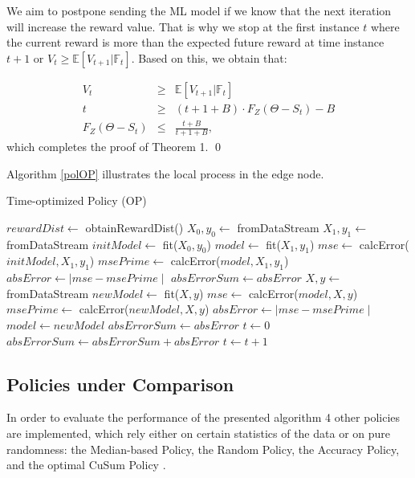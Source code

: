 \documentclass{mpaper}
\begin{document}
We aim to postpone sending the ML model if we know that the next iteration will increase the reward value. That is why we stop at the first instance $t$ where the current reward is more than the expected future reward at time instance $t+1$ or $V_{t} \geq \mathbb{E}[V_{t+1}|\mathbb{F}_{t}]$. Based on this, we obtain that:

\begin{eqnarray}
    V_t & \geq  & \mathbb{E}[V_{t+1}|\mathbb{F}_t] \\
    t & \geq  & (t+1+B)\cdot F_{Z}(\Theta - S_t) - B\\
    F_{Z}(\Theta - S_t) &\leq & \frac{t+B}{t+1+B},
\end{eqnarray}
which completes the proof of Theorem 1. 
\qed

Algorithm \ref{polOP} illustrates the local process in the edge node. 

\begin{algorithm}
\caption{Time-optimized Policy (OP)}\label{polOP}
\begin{algorithmic}
\State $rewardDist \gets$ obtainRewardDist() 
\State $X_0, y_0\gets$ fromDataStream
\State $X_1, y_1 \gets$ fromDataStream
\State $initModel \gets$ fit($X_0, y_0$)
\State $model \gets$ fit($X_1, y_1$)
\State $mse \gets$ calcError($initModel,X_1,y_1$)
\State $msePrime \gets$ calcError($model,X_1,y_1$)
\State $absError \gets \mid mse - msePrime \mid$
\State $absErrorSum \gets absError$
    \State $X, y \gets$ fromDataStream
    \State $newModel \gets$ fit($X,y$)
    \State $mse \gets$ calcError($model,X,y$)
    \State $msePrime \gets$ calcError($newModel,X,y$)
    \State $absError \gets \mid mse - msePrime \mid$
        \State $model \gets newModel$ 
        \State $absErrorSum \gets absError$
        \State $t \gets 0$
    \Else
        \State $absErrorSum \gets absErrorSum + absError$
    \EndIf
    \State $t \gets t + 1$
\EndWhile
\end{algorithmic}
\end{algorithm}

\subsection{Policies under Comparison}
In order to evaluate the performance of the presented algorithm 4 other policies are implemented, which rely either on certain statistics of the data or on pure randomness: the Median-based Policy, the Random Policy, the Accuracy Policy, and the optimal CuSum Policy \cite{cusum_pierre}.
\end{document}
